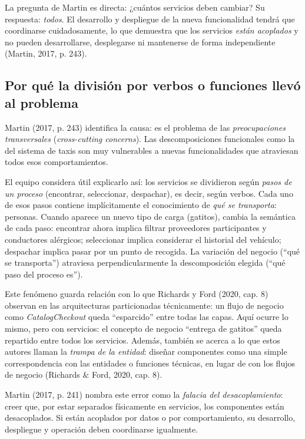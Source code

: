 \documentclass[11pt,a4paper]{article}
\begin{document}
La pregunta de Martin es directa: ¿cuántos servicios deben cambiar? Su respuesta: \emph{todos}. El desarrollo y despliegue de la nueva funcionalidad tendrá que coordinarse cuidadosamente, lo que demuestra que los servicios \emph{están acoplados} y no pueden desarrollarse, desplegarse ni mantenerse de forma independiente (Martin, 2017, p. 243).

\subsection{Por qué la división por verbos o funciones llevó al problema}

Martin (2017, p. 243) identifica la causa: es el problema de las \emph{preocupaciones transversales} (\emph{cross-cutting concerns}). Las descomposiciones funcionales como la del sistema de taxis son muy vulnerables a nuevas funcionalidades que atraviesan todos esos comportamientos.

El equipo considera útil explicarlo así: los servicios se dividieron según \emph{pasos de un proceso} (encontrar, seleccionar, despachar), es decir, según verbos. Cada uno de esos pasos contiene implícitamente el conocimiento de \emph{qué se transporta}: personas. Cuando aparece un nuevo tipo de carga (gatitos), cambia la semántica de cada paso: encontrar ahora implica filtrar proveedores participantes y conductores alérgicos; seleccionar implica considerar el historial del vehículo; despachar implica pasar por un punto de recogida. La variación del negocio (``qué se transporta'') atraviesa perpendicularmente la descomposición elegida (``qué paso del proceso es'').

Este fenómeno guarda relación con lo que Richards y Ford (2020, cap. 8) observan en las arquitecturas particionadas técnicamente: un flujo de negocio como \emph{CatalogCheckout} queda ``esparcido'' entre todas las capas. Aquí ocurre lo mismo, pero con servicios: el concepto de negocio ``entrega de gatitos'' queda repartido entre todos los servicios. Además, también se acerca a lo que estos autores llaman la \emph{trampa de la entidad}: diseñar componentes como una simple correspondencia con las entidades o funciones técnicas, en lugar de con los flujos de negocio (Richards \& Ford, 2020, cap. 8).

Martin (2017, p. 241) nombra este error como la \emph{falacia del desacoplamiento}: creer que, por estar separados físicamente en servicios, los componentes están desacoplados. Si están acoplados por datos o por comportamiento, su desarrollo, despliegue y operación deben coordinarse igualmente.
\end{document}
